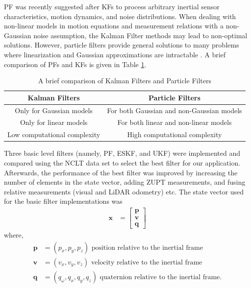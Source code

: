 \gls{PF} was recently suggested after \gls{KF}s to process arbitrary inertial sensor characteristics, motion dynamics, and noise distributions. When dealing with non-linear models in motion equations and measurement relations with a non-Gaussian noise assumption, the Kalman Filter methods may lead to non-optimal solutions. However, particle filters provide general solutions to many problems where linearization and Gaussian approximations are intractable \cite{ch27:ababsa2004comparison}. A brief comparison of \gls{PF}s and \gls{KF}s is given in Table \ref{table:ch:KFandPFComparison}.
\begin{table}[h]
\centering
	\begin{tabular}{|c|c|} 
		\hline
		\textbf{Kalman Filters} & \textbf{Particle Filters} \\
		\hline
		Only for Gaussian models & For both Gaussian and non-Gaussian models\\
		\hline
		Only for linear models& For both linear and non-linear models
		\\
		\hline
		Low computational complexity&High computational complexity\\
		\hline
	\end{tabular}
	\caption{A brief comparison of Kalman Filters and Particle Filters}
	\label{table:ch:KFandPFComparison}
\end{table}

Three basic level filters (namely, \gls{PF}, \gls{ESKF}, and \gls{UKF}) were implemented and compared using the \gls{NCLT} data set to select the best filter for our application. Afterwards, the performance of the  best filter was improved by increasing the number of elements in the state vector, adding \gls{ZUPT} measurements, and fusing relative measurements (visual and \gls{LiDAR} odometry) etc. The state vector used for the basic filter implementations was
\begin{align}
\label{eq:ch:basicStateVector}
   \textbf{x} &= \left[\begin{matrix}{}\textbf{p}\\\textbf{v}\\\textbf{q}\end{matrix}\right]
\end{align}
where,
\begin{align}
	\textbf{p}&=(p_x,p_y,p_z) \text{ position relative to the inertial frame}\\
	\textbf{v}&=(v_x,v_y,v_z) \text{ velocity relative to the inertial frame}\\
	\textbf{q}&=(q_\omega,q_x,q_y,q_z) \text{ quaternion relative to the inertial frame}.
\end{align}

